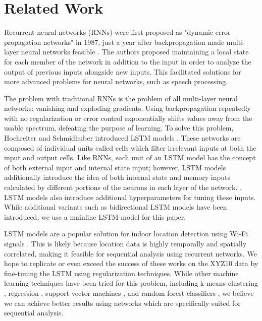 \documentclass[a4paper]{article}
\begin{document}
\section{Related Work}

Recurrent neural networks (RNNs) were first proposed as "dynamic error propagation networks" in 1987, just a year after backpropagation made multi-layer neural networks feasible \cite{robinson_utility_1987}. The authors proposed maintaining a local state for each member of the network in addition to the input in order to analyze the output of previous inputs alongside new inputs. This facilitated solutions for more advanced problems for neural networks, such as speech processing.

The problem with traditional RNNs is the problem of all multi-layer neural networks: vanishing and exploding gradients. Using backpropagation repeatedly with no regularization or error control exponentially shifts values away from the usable spectrum, defeating the purpose of learning. To solve this problem, Hochreiter and Schmidhuber introduced LSTM models \cite{hochreiter_long_1997}. These networks are composed of individual units called cells which filter irrelevant inputs at both the input and output cells. Like RNNs, each unit of an LSTM model has the concept of both external input and internal state input; however, LSTM models additionally introduce the idea of both internal state and memory inputs calculated by different portions of the neurons in each layer of the network. \cite{rivas_deep_2020}. LSTM models also introduce additional hyperparameters for tuning these inputs. While additional variants such as bidirectional LSTM models have been introduced, we use a mainline LSTM model for this paper.

LSTM models are a popular solution for indoor location detection using Wi-Fi signals \cite{elbes_indoor_2019, chen_wifi_2020, hussain_indoor_2019}. This is likely because location data is highly temporally and spatially correlated, making it feasible for sequential analysis using recurrent networks. We hope to replicate or even exceed the success of these works on the XYZ10 data by fine-tuning the LSTM using regularization techniques. While other machine learning techniques have been tried for this problem, including k-means clustering \cite{pasricha_learnloc_2015, salamah_enhanced_2016, jedari_wi-fi_2015}, regression \cite{pasricha_learnloc_2015}, support vector machines \cite{salamah_enhanced_2016}, and random forest classifiers \cite{jedari_wi-fi_2015}, we believe we can achieve better results using networks which are specifically suited for sequential analysis.
\end{document}
